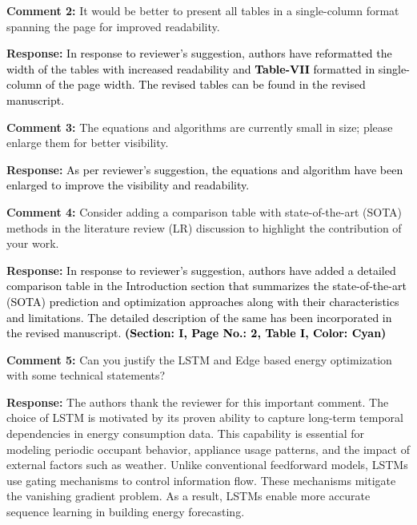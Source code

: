\documentclass[12pt]{article}
\begin{document}
{\noindent\textbf{Comment 2:} It would be better to present all tables in a single-column format spanning the page for improved readability.
\vspace{0.15cm}

\hspace{-1.5em}\textbf{Response:} \noindent\textcolor{black}{In response to reviewer's suggestion, authors have reformatted the width of the tables with increased readability and \textbf{Table-VII} formatted in single-column of the page width. The revised tables can be found in the revised manuscript.}
\newline
\newline


\noindent\textbf{Comment 3:} The equations and algorithms are currently small in size; please enlarge them for better visibility.
\vspace{0.15cm}

\hspace{-1.5em}\textbf{Response:} \noindent\textcolor{black}{As per reviewer's suggestion, the equations and algorithm have been enlarged to improve the visibility and readability.}\newline
\newline




\noindent\textbf{Comment 4:} Consider adding a comparison table with state-of-the-art (SOTA) methods in the literature review (LR) discussion to highlight the contribution of your work.
\vspace{0.15cm}

\hspace{-1.5em}\textbf{Response:} \noindent\textcolor{black}{In response to reviewer's suggestion, authors have added a detailed comparison table in the Introduction section that summarizes the state-of-the-art (SOTA) prediction and optimization approaches along with their characteristics and limitations.  The detailed description of the same has been incorporated in the revised manuscript. \textbf{(Section: I, Page No.: 2, Table I, Color: Cyan)}}\newline
\newline





\noindent\textbf{Comment 5:} Can you justify the LSTM and Edge based energy optimization with some technical statements?
\vspace{0.15cm}

\hspace{-1.5em}\textbf{Response:}
The authors thank the reviewer for this important comment.
The choice of LSTM is motivated by its proven ability to capture long-term temporal dependencies in energy consumption data.
This capability is essential for modeling periodic occupant behavior, appliance usage patterns, and the impact of external factors such as weather.
Unlike conventional feedforward models, LSTMs use gating mechanisms to control information flow.
These mechanisms mitigate the vanishing gradient problem.
As a result, LSTMs enable more accurate sequence learning in building energy forecasting.

}
\end{document}
